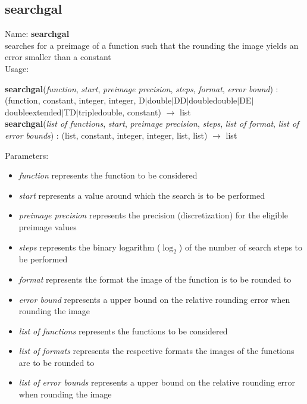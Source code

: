 \subsection{searchgal}
\label{labsearchgal}
\noindent Name: \textbf{searchgal}\\
searches for a preimage of a function such that the rounding the image yields an error smaller than a constant\\
\noindent Usage: 
\begin{center}
\textbf{searchgal}(\emph{function}, \emph{start}, \emph{preimage precision}, \emph{steps}, \emph{format}, \emph{error bound}) : (\textsf{function}, \textsf{constant}, \textsf{integer}, \textsf{integer}, \textsf{D$|$double$|$DD$|$doubledouble$|$DE$|$doubleextended$|$TD$|$tripledouble}, \textsf{constant}) $\rightarrow$ \textsf{list}\\
\textbf{searchgal}(\emph{list of functions}, \emph{start}, \emph{preimage precision}, \emph{steps}, \emph{list of format}, \emph{list of error bounds}) : (\textsf{list}, \textsf{constant}, \textsf{integer}, \textsf{integer}, \textsf{list}, \textsf{list}) $\rightarrow$ \textsf{list}\\
\end{center}
Parameters: 
\begin{itemize}
\item \emph{function} represents the function to be considered
\item \emph{start} represents a value around which the search is to be performed
\item \emph{preimage precision} represents the precision (discretization) for the eligible preimage values
\item \emph{steps} represents the binary logarithm ($\log_2$) of the number of search steps to be performed
\item \emph{format} represents the format the image of the function is to be rounded to
\item \emph{error bound} represents a upper bound on the relative rounding error when rounding the image
\item \emph{list of functions} represents the functions to be considered
\item \emph{list of formats} represents the respective formats the images of the functions are to be rounded to
\item \emph{list of error bounds} represents a upper bound on the relative rounding error when rounding the image
\end{itemize}
